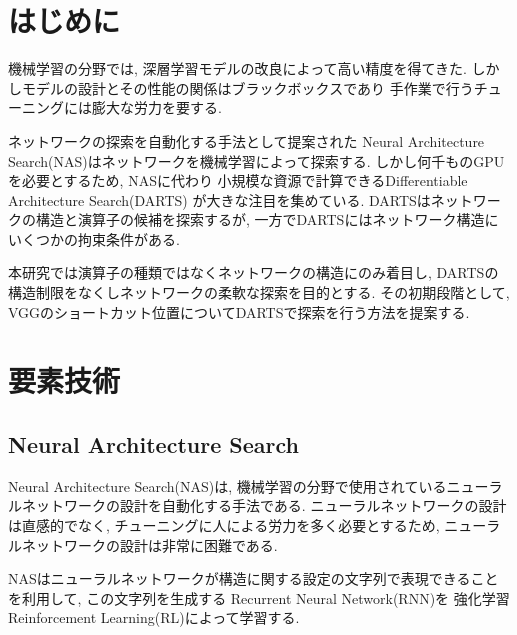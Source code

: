 \documentclass[twocolumn]{jarticle}     %
\begin{document}


\section{はじめに}
機械学習の分野では, 深層学習モデルの改良によって高い精度を得てきた.
しかしモデルの設計とその性能の関係はブラックボックスであり
手作業で行うチューニングには膨大な労力を要する.

ネットワークの探索を自動化する手法として提案された
Neural Architecture Search(NAS)はネットワークを機械学習によって探索する.
しかし何千ものGPUを必要とするため, NASに代わり
小規模な資源で計算できるDifferentiable Architecture Search(DARTS)
が大きな注目を集めている.
DARTSはネットワークの構造と演算子の候補を探索するが,
一方でDARTSにはネットワーク構造にいくつかの拘束条件がある.

本研究では演算子の種類ではなくネットワークの構造にのみ着目し,
DARTSの構造制限をなくしネットワークの柔軟な探索を目的とする.
その初期段階として, VGGのショートカット位置についてDARTSで探索を行う方法を提案する.

\section{要素技術}

\subsection{Neural Architecture Search}
Neural Architecture Search(NAS)\cite{DBLP:journals/corr/ZophL16}は,
機械学習の分野で使用されているニューラルネットワークの設計を自動化する手法である.
ニューラルネットワークの設計は直感的でなく,
チューニングに人による労力を多く必要とするため,
ニューラルネットワークの設計は非常に困難である.

NASはニューラルネットワークが構造に関する設定の文字列で表現できることを利用して,
この文字列を生成する
Recurrent Neural Network(RNN)を
強化学習 Reinforcement Learning(RL)によって学習する.
\end{document}
